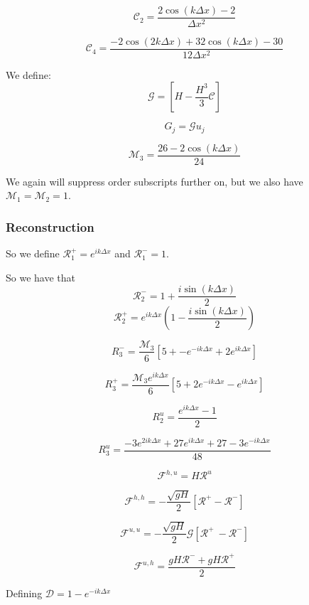 \documentclass[12pt]{article}
\begin{document}
\

\[\mathcal{C}_2 = \frac{ 2\cos\left(k\Delta x\right) - 2 }{\Delta x^2}\]


\[\mathcal{C}_4 = \frac{-2\cos\left(2k\Delta x\right) + 32\cos\left(k\Delta x\right)  - 30 }{12\Delta x^2}\]


We define:
\[\mathcal{G} = \left[H -\frac{H^3}{3} \mathcal{C}\right]\]


\[G_j = \mathcal{G}u_j\]



\[\mathcal{M}_3= \frac{26  -2\cos\left(k\Delta x\right)}{24}\]

We again will suppress order subscripts further on, but we also have $\mathcal{M}_1 = \mathcal{M}_2 = 1$.
\subsubsection{Reconstruction}


So we define $\mathcal{R}^+_1 =  e^{ik\Delta x}$ and $\mathcal{R}^-_1 =  1$. 

So we have that
\[\mathcal{R}_2^- = 1  + \frac{i\sin\left(k\Delta x\right)}{2}\]
\[\mathcal{R}_2^+ = e^{ik\Delta x}\left(1  - \frac{i\sin\left(k\Delta x\right)}{2} \right)\]

\[R_3^-= \frac{\mathcal{M}_3}{6}\left[5 +  - e^{-ik\Delta x} + 2e^{ik\Delta x} \right]\]


\[R_3^+= \frac{\mathcal{M}_3 e^{ik\Delta x }}{6}\left[5 + 2e^{-ik\Delta x} - e^{ik\Delta x} \right]\] 

\[R^u_2 = \frac{e^{ik\Delta x } - 1}{2} \]

\[R^u_3 = \frac{-3e^{2ik\Delta x } + 27e^{ik\Delta x } + 27 - 3e^{-ik\Delta x }}{48}\]


\[\mathcal{F}^{h,u} = H\mathcal{R}^u\]

\[\mathcal{F}^{h,h} = -\dfrac{ \sqrt{gH}}{ 2} \left [ \mathcal{R}^+- \mathcal{R}^- \right ]\]

\[\mathcal{F}^{u,u} = - \dfrac{ \sqrt{gH}}{ 2} \mathcal{G} \left [ \mathcal{R}^+ \ -  \mathcal{R}^-  \right ]\]

\[\mathcal{F}^{u,h} = \dfrac{ gH \mathcal{R}^- + gH \mathcal{R}^+}{ 2}\]


Defining $\mathcal{D} = 1 -e^{-ik\Delta x}$
\end{document}

